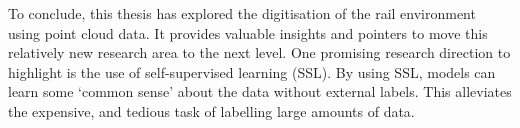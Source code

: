To conclude, this thesis has explored the digitisation of the rail environment using point cloud data. It provides valuable insights and pointers to move this relatively new research area to the next level. One promising research direction to highlight is the use of self-supervised learning (SSL). By using SSL, models can learn some `common sense' about the data without external labels. This alleviates the expensive, and tedious task of labelling large amounts of data.

